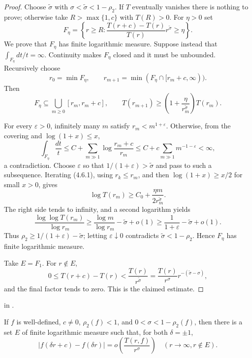 \begin{proof}
\leanok
Choose $\widetilde\sigma$ with
$\sigma<\widetilde\sigma<1-\rho_2$.  If $T$ eventually vanishes there is
nothing to prove; otherwise take $R>\max\{1,c\}$ with $T(R)>0$.  For
$\eta>0$ set
\[
 F_\eta=\left\{r\geq R:
 \frac{T(r+c)-T(r)}{T(r)}r^{\widetilde\sigma}\geq\eta\right\}.
\]
We prove that $F_\eta$ has finite logarithmic measure.  Suppose instead that
$\int_{F_\eta}dt/t=\infty$.  Continuity makes $F_\eta$ closed and it must be
unbounded.  Recursively choose
\[
 r_0=\min F_\eta,\qquad
 r_{m+1}=\min(F_\eta\cap[r_m+c,\infty)).
\]
Then
\[
 F_\eta\subseteq\bigcup_{m\geq0}[r_m,r_m+c],\qquad
 T(r_{m+1})\geq
 \left(1+\frac{\eta}{r_m^{\widetilde\sigma}}\right)T(r_m).       \tag{4.6.1}
\]

For every $\varepsilon>0$, infinitely many $m$ satisfy
$r_m<m^{1+\varepsilon}$.  Otherwise, from the covering and
$\log(1+x)\leq x$,
\[
 \int_{F_\eta}\frac{dt}{t}
 \leq C+\sum_{m\gg1}\log\frac{r_m+c}{r_m}
 \leq C+c\sum_{m\gg1}m^{-1-\varepsilon}<\infty,
\]
a contradiction.  Choose $\varepsilon$ so that
$1/(1+\varepsilon)>\widetilde\sigma$ and pass to such a subsequence.
Iterating (4.6.1), using $r_k\leq r_m$, and then
$\log(1+x)\geq x/2$ for small $x>0$, gives
\[
 \log T(r_m)\geq C_0+
 \frac{\eta m}{2r_m^{\widetilde\sigma}}.
\]
The right side tends to infinity, and a second logarithm yields
\[
 \frac{\log\log T(r_m)}{\log r_m}
 \geq\frac{\log m}{\log r_m}-\widetilde\sigma+o(1)
 \geq\frac1{1+\varepsilon}-\widetilde\sigma+o(1).
\]
Thus $\rho_2\geq1/(1+\varepsilon)-\widetilde\sigma$; letting
$\varepsilon\downarrow0$ contradicts
$\widetilde\sigma<1-\rho_2$.  Hence $F_\eta$ has finite logarithmic measure.

Take $E=F_1$.  For $r\notin E$,
\[
 0\leq T(r+c)-T(r)<\frac{T(r)}{r^{\widetilde\sigma}}
 =\frac{T(r)}{r^\sigma}r^{-(\widetilde\sigma-\sigma)},
\]
and the final factor tends to zero.  This is the claimed estimate.
\end{proof}

\begin{leanproof}
 in .
\end{leanproof}

\begin{theorem}
\leanok
{}
If $f$ is well-defined, $c\neq0$, $\rho_2(f)<1$, and
$0<\sigma<1-\rho_2(f)$, then there is a set $E$ of finite logarithmic
measure such that, for both $\delta=\pm1$,
\[
 |f(\delta r+c)-f(\delta r)|
 =o\!\left(\frac{T(r,f)}{r^\sigma}\right)
 \quad(r\to\infty, r\notin E).
\]
\end{theorem}

